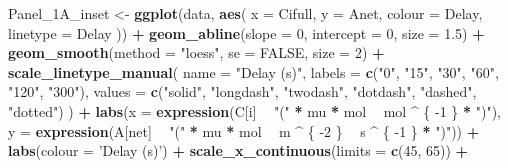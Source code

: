 \documentclass[
]{krantz}
\makeatletter
\newenvironment{Shaded}{\begin{snugshade}}{\end{snugshade}}
\newcommand{\DataTypeTok}[1]{\textcolor[rgb]{0.13,0.29,0.53}{#1}}
\newcommand{\DecValTok}[1]{\textcolor[rgb]{0.00,0.00,0.81}{#1}}
\newcommand{\FloatTok}[1]{\textcolor[rgb]{0.00,0.00,0.81}{#1}}
\newcommand{\KeywordTok}[1]{\textcolor[rgb]{0.13,0.29,0.53}{\textbf{#1}}}
\newcommand{\NormalTok}[1]{#1}
\newcommand{\OperatorTok}[1]{\textcolor[rgb]{0.81,0.36,0.00}{\textbf{#1}}}
\newcommand{\OtherTok}[1]{\textcolor[rgb]{0.56,0.35,0.01}{#1}}
\newcommand{\StringTok}[1]{\textcolor[rgb]{0.31,0.60,0.02}{#1}}
\newenvironment{kframe}{%
\medskip{}
\setlength{\fboxsep}{.8em}
 \def\at@end@of@kframe{}%
 \ifinner\ifhmode%
  \def\at@end@of@kframe{\end{minipage}}%
  \begin{minipage}{\columnwidth}%
 \fi\fi%
 \def\FrameCommand##1{\hskip\@totalleftmargin \hskip-\fboxsep
 \colorbox{shadecolor}{##1}\hskip-\fboxsep
     \hskip-\linewidth \hskip-\@totalleftmargin \hskip\columnwidth}%
 \MakeFramed {\advance\hsize-\width
   \@totalleftmargin\z@ \linewidth\hsize
   \@setminipage}}%
 {\par\unskip\endMakeFramed%
 \at@end@of@kframe}
\renewenvironment{Shaded}{\begin{kframe}}{\end{kframe}}
\makeatother
\begin{document}
\begin{Shaded}
\begin{Highlighting}[]
\NormalTok{Panel_1A_inset <-}
\StringTok{  }\KeywordTok{ggplot}\NormalTok{(data, }\KeywordTok{aes}\NormalTok{(}
    \DataTypeTok{x =}\NormalTok{ Cifull,}
    \DataTypeTok{y =}\NormalTok{ Anet,}
    \DataTypeTok{colour =}\NormalTok{ Delay,}
    \DataTypeTok{linetype =}\NormalTok{ Delay}
\NormalTok{  )) }\OperatorTok{+}
\StringTok{  }\KeywordTok{geom_abline}\NormalTok{(}\DataTypeTok{slope =} \DecValTok{0}\NormalTok{,}
              \DataTypeTok{intercept =} \DecValTok{0}\NormalTok{,}
              \DataTypeTok{size =} \FloatTok{1.5}\NormalTok{) }\OperatorTok{+}
\StringTok{  }\KeywordTok{geom_smooth}\NormalTok{(}\DataTypeTok{method =} \StringTok{"loess"}\NormalTok{, }\DataTypeTok{se =} \OtherTok{FALSE}\NormalTok{, }\DataTypeTok{size =} \DecValTok{2}\NormalTok{) }\OperatorTok{+}
\StringTok{  }\KeywordTok{scale_linetype_manual}\NormalTok{(}
    \DataTypeTok{name =} \StringTok{"Delay (s)"}\NormalTok{,}
    \DataTypeTok{labels =} \KeywordTok{c}\NormalTok{(}\StringTok{"0"}\NormalTok{, }\StringTok{"15"}\NormalTok{, }\StringTok{"30"}\NormalTok{, }\StringTok{"60"}\NormalTok{, }\StringTok{"120"}\NormalTok{, }\StringTok{"300"}\NormalTok{),}
    \DataTypeTok{values =} \KeywordTok{c}\NormalTok{(}\StringTok{"solid"}\NormalTok{, }\StringTok{"longdash"}\NormalTok{, }\StringTok{"twodash"}\NormalTok{, }\StringTok{"dotdash"}\NormalTok{, }\StringTok{"dashed"}\NormalTok{, }\StringTok{"dotted"}\NormalTok{)}
\NormalTok{  ) }\OperatorTok{+}
\StringTok{  }\KeywordTok{labs}\NormalTok{(}\DataTypeTok{x =} \KeywordTok{expression}\NormalTok{(C[i] }\OperatorTok{~}\StringTok{ "("} \OperatorTok{*}\StringTok{ }\NormalTok{mu }\OperatorTok{*}\StringTok{ }\NormalTok{mol }\OperatorTok{~}\StringTok{ }\NormalTok{mol }\OperatorTok{^}\StringTok{ }\NormalTok{\{}
    \DecValTok{-1}
\NormalTok{  \} }\OperatorTok{*}\StringTok{ ")"}\NormalTok{),}
  \DataTypeTok{y =} \KeywordTok{expression}\NormalTok{(A[net] }\OperatorTok{~}\StringTok{ "("} \OperatorTok{*}\StringTok{ }\NormalTok{mu }\OperatorTok{*}\StringTok{ }\NormalTok{mol }\OperatorTok{~}\StringTok{ }\NormalTok{m }\OperatorTok{^}\StringTok{ }\NormalTok{\{}
    \DecValTok{-2}
\NormalTok{  \} }\OperatorTok{~}\StringTok{ }\NormalTok{s }\OperatorTok{^}\StringTok{ }\NormalTok{\{}
    \DecValTok{-1}
\NormalTok{  \} }\OperatorTok{*}\StringTok{ ")"}\NormalTok{)) }\OperatorTok{+}
\StringTok{  }\KeywordTok{labs}\NormalTok{(}\DataTypeTok{colour =} \StringTok{'Delay (s)'}\NormalTok{) }\OperatorTok{+}
\StringTok{  }\KeywordTok{scale_x_continuous}\NormalTok{(}\DataTypeTok{limits =} \KeywordTok{c}\NormalTok{(}\DecValTok{45}\NormalTok{, }\DecValTok{65}\NormalTok{)) }\OperatorTok{+}

\end{Highlighting}
\end{Shaded}
\end{document}
